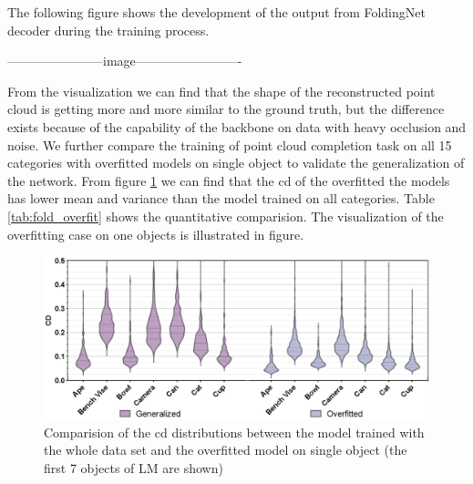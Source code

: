 \documentclass[12pt,DIV14,BCOR12mm,a4paper,footinclude=false,headinclude,parskip=half-,twoside,openright,cleardoublepage=empty,toc=index,bibliography=totoc,listof=totoc]{scrreprt}
\numberwithin{equation}{chapter}
\begin{document}
The following figure shows the development of the output from FoldingNet decoder during the training process.

-----------------------image-------------------------

From the visualization we can find that the shape of the reconstructed point cloud is getting more and more similar to the ground truth, but the difference exists because of the capability of the backbone on data with heavy occlusion and noise. We further compare the training of point cloud completion task on all 15 categories with overfitted models on single object to validate the generalization of the network. From figure \ref{img:fold_overfit} we can find that the \gls{cd} of the overfitted the models has lower mean and variance than the model trained on all categories. Table \ref{tab:fold_overfit} shows the quantitative comparision. The visualization of the overfitting case on one objects is illustrated in figure.
\begin{figure}[h]
	\centering
	\includegraphics[width=1.\textwidth]{img/fold_overfit.eps}
	\caption{Comparision of the \gls{cd} distributions between the model trained with the whole data set and the overfitted model on single object (the first 7 objects of LM are shown)}
	\label{img:fold_overfit}
\end{figure}
\end{document}
